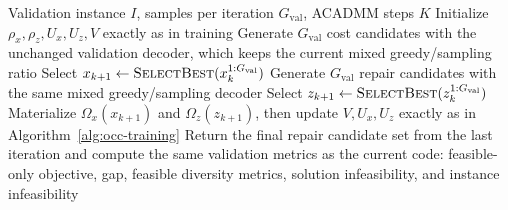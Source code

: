\begin{algorithm}[t]
\caption{Inference and validation}
\label{alg:occ-inference}
\begin{algorithmic}[1]
\REQUIRE Validation instance $I$, samples per iteration $G_{\mathrm{val}}$, ACADMM steps $K$
\STATE Initialize $\rho_x,\rho_z,U_x,U_z,V$ exactly as in training
    \STATE Generate $G_{\mathrm{val}}$ cost candidates with the unchanged validation decoder, which keeps the current mixed greedy/sampling ratio
    \STATE Select $x_{k+1}\leftarrow\textsc{SelectBest}(x_k^{1:G_{\mathrm{val}}})$
    \STATE Generate $G_{\mathrm{val}}$ repair candidates with the same mixed greedy/sampling decoder
    \STATE Select $z_{k+1}\leftarrow\textsc{SelectBest}(z_k^{1:G_{\mathrm{val}}})$
    \STATE Materialize $\Omega_x(x_{k+1})$ and $\Omega_z(z_{k+1})$, then update $V,U_x,U_z$ exactly as in Algorithm~\ref{alg:occ-training}
\ENDFOR
\STATE Return the final repair candidate set from the last iteration and compute the same validation metrics as the current code: feasible-only objective, gap, feasible diversity metrics, solution infeasibility, and instance infeasibility
\end{algorithmic}
\end{algorithm}
